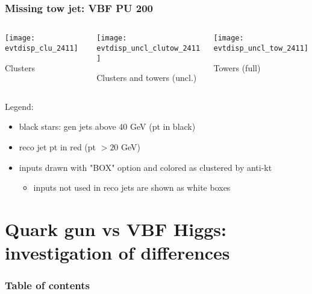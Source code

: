 \documentclass[8pt]{beamer}
\begin{document}
  \begin{frame}
  \frametitle{Missing tow jet: VBF PU 200}
  
  \begin{columns}
   \begin{column}{0.4\textwidth}
    \texttt{[image: evtdisp\_clu\_2411]}
    
    \small Clusters
   \end{column}
   \begin{column}{0.4\textwidth}
    \texttt{[image: evtdisp\_uncl\_clutow\_2411]}
    
    \small Clusters and towers (uncl.)
   \end{column}
   \begin{column}{0.4\textwidth}
    \texttt{[image: evtdisp\_uncl\_tow\_2411]}
    
    \small Towers (full)
   \end{column}
  \end{columns}
  
  \vspace{20pt}

  Legend:
  
  \begin{itemize}
   \item black stars: gen jets above 40 GeV (pt in black)
   \item reco jet pt in red (pt $>20$ GeV)
   \item inputs drawn with "BOX" option and colored as clustered by anti-kt
   \begin{itemize}
    \item inputs not used in reco jets are shown as white boxes
   \end{itemize}
  \end{itemize}

 \end{frame}
 
 
 \section{Quark gun vs VBF Higgs: investigation of differences}
 
 \begin{frame}
 \frametitle{Table of contents}
 
\end{frame}
\end{document}
